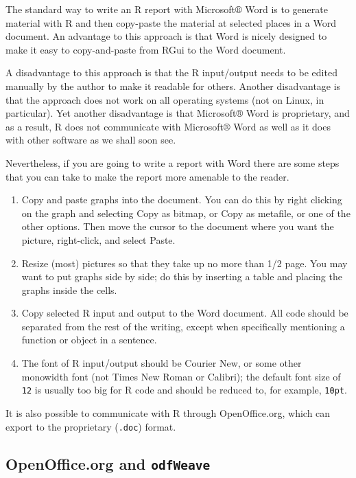 \documentclass[captions=tableheading]{scrbook}
\begin{document}
The standard way to write an \textsf{R} report with Microsoft$\circledR$ Word is to generate material with \textsf{R} and then copy-paste the material at selected places in a Word document. An advantage to this approach is that Word is nicely designed to make it easy to copy-and-paste from \textsf{RGui} to the Word document.

A disadvantage to this approach is that the R input/output needs to be edited manually by the author to make it readable for others. Another disadvantage is that the approach does not work on all operating systems (not on Linux, in particular). Yet another disadvantage is that Microsoft$\circledR$ Word is proprietary, and as a result, \textsf{R} does not communicate with Microsoft$\circledR$ Word as well as it does with other software as we shall soon see.

Nevertheless, if you are going to write a report with Word there are some steps that you can take to make the report more amenable to the reader. 

\begin{enumerate}
\item Copy and paste graphs into the document. You can do this by right clicking on the graph and selecting \textsf{Copy as bitmap,} or \textsf{Copy as metafile}, or one of the other options. Then move the cursor to the document where you want the picture, right-click, and select \textsf{Paste}.
\item Resize (most) pictures so that they take up no more than 1/2 page. You may want to put graphs side by side; do this by inserting a table and placing the graphs inside the cells.
\item Copy selected \textsf{R} input and output to the Word document. All code should be separated from the rest of the writing, except when specifically mentioning a function or object in a sentence.
\item The font of \textsf{R} input/output should be Courier New, or some other monowidth font (not Times New Roman or Calibri); the default font size of \texttt{12} is usually too big for \textsf{R} code and should be reduced to, for example, \texttt{10pt}.
\end{enumerate}

It is also possible to communicate with \textsf{R} through OpenOffice.org, which can export to the proprietary (\texttt{.doc}) format.
\subsection{OpenOffice.org and \texttt{odfWeave}}
\label{sec-7-2-2}
\end{document}
